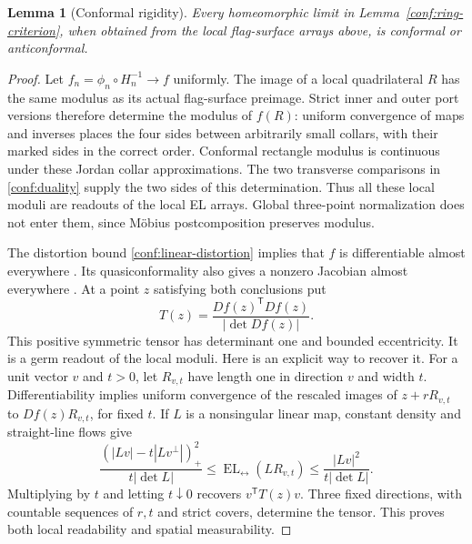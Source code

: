 \documentclass[11pt]{article}
\numberwithin{equation}{section}
\newtheorem{lemma}[theorem]{Lemma}
\theoremstyle{definition}
\theoremstyle{remark}
\newcommand{\1}{\mathbf 1}
\DeclareMathOperator{\EL}{EL}
\begin{document}
\begin{lemma}[Conformal rigidity]
\label{conf:tensor}
Every homeomorphic limit in Lemma~\ref{conf:ring-criterion}, when
obtained from the local flag-surface arrays above, is conformal or
anticonformal.
\end{lemma}

\begin{proof}
Let \(f_n=\phi_n\circ H_n^{-1}\to f\) uniformly.  The image
of a local quadrilateral \(R\) has the same modulus as its actual
flag-surface preimage.  Strict inner and outer port versions
therefore determine the modulus of \(f(R)\): uniform convergence
of maps and inverses places the four sides between arbitrarily
small collars, with their marked sides in the correct order.
Conformal rectangle modulus is continuous under these Jordan
collar approximations.  The two transverse comparisons in
\eqref{conf:duality} supply the two sides of this determination.
Thus all these local moduli are readouts of the local EL arrays.
Global three-point normalization does not enter them, since
M\"obius postcomposition preserves modulus.

The distortion bound \eqref{conf:linear-distortion} implies that
\(f\) is differentiable almost everywhere
\cite[Lemma~2]{Cristea1989Quasiconformality}.  Its quasiconformality
also gives a nonzero Jacobian almost everywhere
\cite[Theorem~3.1.2]{AstalaIwaniecMartin2009}.
At a point \(z\) satisfying both conclusions put
\begin{equation}
 T(z)=\frac{Df(z)^{\mathsf T}Df(z)}{|\det Df(z)|}.
 \label{conf:tensor-definition}
\end{equation}
This positive symmetric tensor has determinant one and bounded
eccentricity.  It is a germ readout of the local moduli.  Here is
an explicit way to recover it.  For a unit vector \(v\) and
\(t>0\), let \(R_{v,t}\) have length one in direction \(v\)
and width \(t\).  Differentiability implies uniform convergence
of the rescaled images of \(z+rR_{v,t}\) to
\(Df(z)R_{v,t}\), for fixed \(t\).  If \(L\) is a nonsingular
linear map, constant density and straight-line flows give
\[
 \frac{(|Lv|-t|Lv^\perp|)_+^2}{t|\det L|}
 \le \EL_{\leftrightarrow}(LR_{v,t})
 \le \frac{|Lv|^2}{t|\det L|}.
\]
Multiplying by \(t\) and letting \(t\downarrow0\) recovers
\(v^{\mathsf T}T(z)v\).  Three fixed directions, with countable
sequences of \(r,t\) and strict covers, determine the tensor.
This proves both local readability and spatial measurability.


\end{proof}
\end{document}
